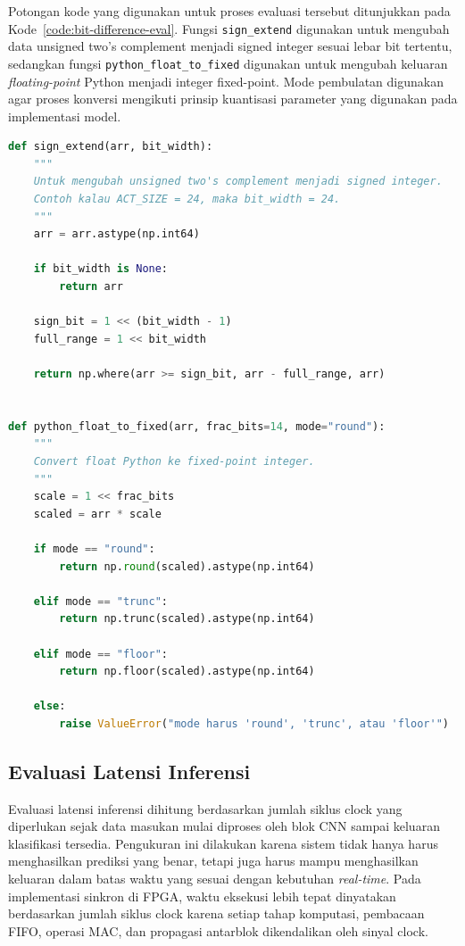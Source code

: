 	Potongan kode yang digunakan untuk proses evaluasi tersebut ditunjukkan pada
	Kode~\ref{code:bit-difference-eval}. Fungsi \texttt{sign\_extend}
	digunakan untuk mengubah data unsigned two's complement menjadi signed integer
	sesuai lebar bit tertentu, sedangkan fungsi \texttt{python\_float\_to\_fixed}
	digunakan untuk mengubah keluaran \emph{floating-point} Python menjadi integer
	fixed-point. Mode pembulatan digunakan agar proses konversi mengikuti prinsip
	kuantisasi parameter yang digunakan pada implementasi model.

	\begin{lstlisting}[language=Python, title={Kode evaluasi perbedaan bit Python dan Verilog}, label={code:bit-difference-eval}]
def sign_extend(arr, bit_width):
    """
    Untuk mengubah unsigned two's complement menjadi signed integer.
    Contoh kalau ACT_SIZE = 24, maka bit_width = 24.
    """
    arr = arr.astype(np.int64)

    if bit_width is None:
        return arr

    sign_bit = 1 << (bit_width - 1)
    full_range = 1 << bit_width

    return np.where(arr >= sign_bit, arr - full_range, arr)


def python_float_to_fixed(arr, frac_bits=14, mode="round"):
    """
    Convert float Python ke fixed-point integer.
    """
    scale = 1 << frac_bits
    scaled = arr * scale

    if mode == "round":
        return np.round(scaled).astype(np.int64)

    elif mode == "trunc":
        return np.trunc(scaled).astype(np.int64)

    elif mode == "floor":
        return np.floor(scaled).astype(np.int64)

    else:
        raise ValueError("mode harus 'round', 'trunc', atau 'floor'")
	\end{lstlisting}

    \subsection{Evaluasi Latensi Inferensi}
	Evaluasi latensi inferensi dihitung berdasarkan jumlah siklus clock yang diperlukan sejak data masukan mulai diproses oleh blok CNN sampai keluaran klasifikasi tersedia. Pengukuran ini dilakukan karena sistem tidak hanya harus menghasilkan prediksi yang benar, tetapi juga harus mampu menghasilkan keluaran dalam batas waktu yang sesuai dengan kebutuhan \emph{real-time}. Pada implementasi sinkron di FPGA, waktu eksekusi lebih tepat dinyatakan berdasarkan jumlah siklus clock karena setiap tahap komputasi, pembacaan FIFO, operasi MAC, dan propagasi antarblok dikendalikan oleh sinyal clock.

